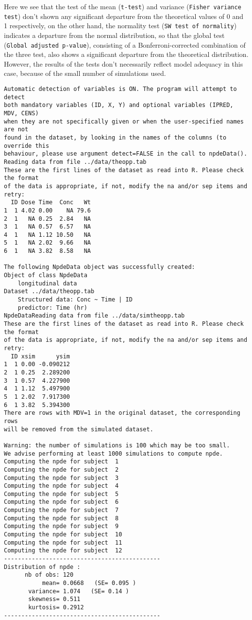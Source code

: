 Here we see that the test of the mean (\texttt{t-test}) and variance (\texttt{Fisher variance test}) don't shown any significant departure from the theoretical values of 0 and 1 respectively, on the other hand, the normality test (\texttt{SW test of normality}) indicates a departure from the normal distribution, so that the global test (\texttt{Global adjusted p-value}), consisting of a Bonferroni-corrected combination of the three test, also shows a significant departure from the theoretical distribution. However, the results of the tests don't necessarily reflect model adequacy in this case, because of the small number of simulations used.
{\small
\begin{verbatim}
Automatic detection of variables is ON. The program will attempt to detect
both mandatory variables (ID, X, Y) and optional variables (IPRED, MDV, CENS) 
when they are not specifically given or when the user-specified names are not 
found in the dataset, by looking in the names of the columns (to override this 
behaviour, please use argument detect=FALSE in the call to npdeData().
Reading data from file ../data/theopp.tab 
These are the first lines of the dataset as read into R. Please check the format 
of the data is appropriate, if not, modify the na and/or sep items and retry:
  ID Dose Time  Conc   Wt
1  1 4.02 0.00    NA 79.6
2  1   NA 0.25  2.84   NA
3  1   NA 0.57  6.57   NA
4  1   NA 1.12 10.50   NA
5  1   NA 2.02  9.66   NA
6  1   NA 3.82  8.58   NA

The following NpdeData object was successfully created:
Object of class NpdeData
    longitudinal data
Dataset ../data/theopp.tab 
    Structured data: Conc ~ Time | ID 
    predictor: Time (hr) 
NpdeDataReading data from file ../data/simtheopp.tab 
These are the first lines of the dataset as read into R. Please check the format 
of the data is appropriate, if not, modify the na and/or sep items and retry:
  ID xsim      ysim
1  1 0.00 -0.090212
2  1 0.25  2.289200
3  1 0.57  4.227900
4  1 1.12  5.497900
5  1 2.02  7.917300
6  1 3.82  5.394300
There are rows with MDV=1 in the original dataset, the corresponding rows 
will be removed from the simulated dataset.

Warning: the number of simulations is 100 which may be too small.
We advise performing at least 1000 simulations to compute npde.
Computing the npde for subject  1 
Computing the npde for subject  2 
Computing the npde for subject  3 
Computing the npde for subject  4 
Computing the npde for subject  5 
Computing the npde for subject  6 
Computing the npde for subject  7 
Computing the npde for subject  8 
Computing the npde for subject  9 
Computing the npde for subject  10 
Computing the npde for subject  11 
Computing the npde for subject  12 
---------------------------------------------
Distribution of npde :
      nb of obs: 120 
           mean= 0.0668   (SE= 0.095 )
       variance= 1.074   (SE= 0.14 )
       skewness= 0.511 
       kurtosis= 0.2912 
---------------------------------------------


\end{verbatim}}
